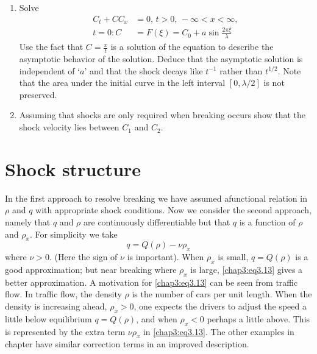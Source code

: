 \begin{enumerate}
\item Solve
\begin{align*}
C_t +CC_x&=0, \,t>0, \, -\infty < x < \infty,\\
t=0: C&=F(\xi)=C_0+a\sin\frac{2\pi\xi}{\lambda}
\end{align*}
Use the fact that $C=\frac{x}{t}$ is a solution of the equation to describe the asymptotic behavior of the solution. Deduce that the asymptotic solution is independent of `$a$' and that the shock decays like $t^{-1}$ rather than $t^{1/2}$. Note that the area under the initial curve in the left interval $[0,\lambda/2]$ is not preserved.

\item Assuming that shocks are only required when breaking occurs show that the shock velocity lies between $C_1$ and $C_2$. 
\end{enumerate}

\section{Shock structure}\label{chap3:sec3.4}

In the first approach to resolve breaking we have assumed a\pageoriginale functional relation in $\rho$ and $q$ with appropriate shock conditions. Now we consider the second approach, namely that $q$ and $\rho$ are continuously differentiable but that $q$ is a function of $\rho$ and $\rho_x$. For simplicity we take 
\begin{equation}
q=Q(\rho)-\nu\rho_x\tag{3.13}\label{chap3:eq3.13}
\end{equation}
where $\nu > 0$. (Here the sign of $\nu$ is important). When $\rho_x$ is small, $q=Q(\rho)$ is a good approximation; but near breaking where $\rho_x$ is large, \eqref{chap3:eq3.13} gives a better approximation. A motivation for \eqref{chap3:eq3.13} can be seen from traffic flow. In traffic flow, the density $\rho$ is the number of cars per unit length. When the density is increasing ahead, $\rho_x >0$, one expects the drivers to adjust the speed a little below equilibrium $q=Q(\rho)$, and when $\rho_x<0$ perhaps a little above. This is represented by the extra term $\nu\rho_x$ in \eqref{chap3:eq3.13}. The other examples in chapter have similar correction terms in an improved description.

